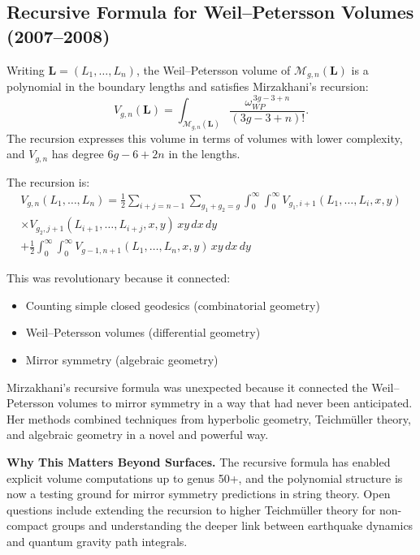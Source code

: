 \subsection{Recursive Formula for Weil--Petersson Volumes (2007--2008)}

\begin{theorem}
Writing $\mathbf L=(L_1,\ldots,L_n)$, the Weil--Petersson volume
of $\mathcal{M}_{g,n}(\mathbf L)$ is a polynomial in the boundary
lengths and satisfies Mirzakhani's recursion:
\begin{equation}
 V_{g,n}(\mathbf L) = \int_{\mathcal{M}_{g,n}(\mathbf L)}
 \frac{\omega_{WP}^{\,3g-3+n}}{(3g-3+n)!}.
\end{equation}
The recursion expresses this volume in terms of volumes with lower
complexity, and $V_{g,n}$ has degree $6g-6+2n$ in the lengths.
\end{theorem}

The recursion is:
\begin{multline}
V_{g,n}(L_1, \ldots, L_n) = \frac{1}{2} \sum_{i+j = n-1} \sum_{g_1+g_2 = g} \int_0^\infty \int_0^\infty V_{g_1,i+1}(L_1, \ldots, L_i, x, y) \\
\times V_{g_2,j+1}(L_{i+1}, \ldots, L_{i+j}, x, y) \, x y \, dx \, dy \\
+ \frac{1}{2} \int_0^\infty \int_0^\infty V_{g-1,n+1}(L_1, \ldots, L_n, x, y) \, x y \, dx \, dy
\end{multline}

This was revolutionary because it connected:
\begin{itemize}
\item Counting simple closed geodesics (combinatorial geometry)
\item Weil--Petersson volumes (differential geometry)
\item Mirror symmetry (algebraic geometry)
\end{itemize}

\begin{highlightbox}
Mirzakhani's recursive formula was unexpected because it connected the Weil--Petersson volumes to mirror symmetry in a way that had never been anticipated. Her methods combined techniques from hyperbolic geometry, Teichm\"uller theory, and algebraic geometry in a novel and powerful way.
\end{highlightbox}

\textbf{Why This Matters Beyond Surfaces.} The recursive formula has enabled explicit volume computations up to genus 50+, and the polynomial structure is now a testing ground for mirror symmetry predictions in string theory. Open questions include extending the recursion to higher Teichm\"uller theory for non-compact groups and understanding the deeper link between earthquake dynamics and quantum gravity path integrals.

